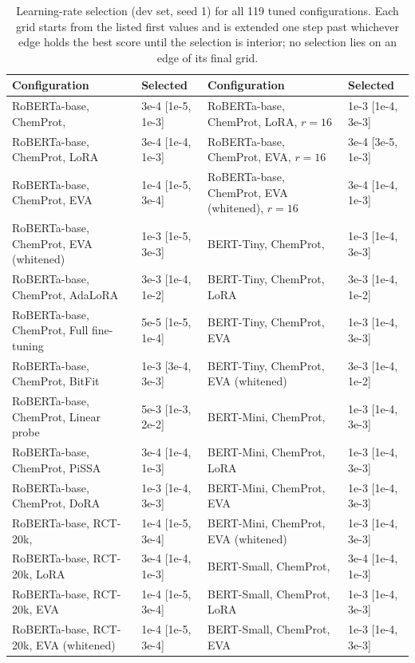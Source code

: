 \begin{table}[!ht]
\centering
\caption{Learning-rate selection (dev set, seed 1) for all 119 tuned configurations. Each grid starts from the listed first values and is extended one step past whichever edge holds the best score until the selection is interior; no selection lies on an edge of its final grid.}
\label{tab:lr}
\scriptsize
\setlength{\tabcolsep}{3pt}
\begin{tabular}{llll}
\toprule
Configuration & Selected & Configuration & Selected \\
\midrule
RoBERTa-base, ChemProt, \method{} & 3e-4 [1e-5, 1e-3] & RoBERTa-base, ChemProt, LoRA, $r{=}16$ & 1e-3 [1e-4, 3e-3] \\
RoBERTa-base, ChemProt, LoRA & 3e-4 [1e-4, 1e-3] & RoBERTa-base, ChemProt, EVA, $r{=}16$ & 3e-4 [3e-5, 1e-3] \\
RoBERTa-base, ChemProt, EVA & 1e-4 [1e-5, 3e-4] & RoBERTa-base, ChemProt, EVA (whitened), $r{=}16$ & 3e-4 [1e-4, 1e-3] \\
RoBERTa-base, ChemProt, EVA (whitened) & 1e-3 [1e-5, 3e-3] & BERT-Tiny, ChemProt, \method{} & 1e-3 [1e-4, 3e-3] \\
RoBERTa-base, ChemProt, AdaLoRA & 3e-3 [1e-4, 1e-2] & BERT-Tiny, ChemProt, LoRA & 3e-3 [1e-4, 1e-2] \\
RoBERTa-base, ChemProt, Full fine-tuning & 5e-5 [1e-5, 1e-4] & BERT-Tiny, ChemProt, EVA & 1e-3 [1e-4, 3e-3] \\
RoBERTa-base, ChemProt, BitFit & 1e-3 [3e-4, 3e-3] & BERT-Tiny, ChemProt, EVA (whitened) & 3e-3 [1e-4, 1e-2] \\
RoBERTa-base, ChemProt, Linear probe & 5e-3 [1e-3, 2e-2] & BERT-Mini, ChemProt, \method{} & 1e-3 [1e-4, 3e-3] \\
RoBERTa-base, ChemProt, PiSSA & 3e-4 [1e-4, 1e-3] & BERT-Mini, ChemProt, LoRA & 1e-3 [1e-4, 3e-3] \\
RoBERTa-base, ChemProt, DoRA & 1e-3 [1e-4, 3e-3] & BERT-Mini, ChemProt, EVA & 1e-3 [1e-4, 3e-3] \\
RoBERTa-base, RCT-20k, \method{} & 1e-4 [1e-5, 3e-4] & BERT-Mini, ChemProt, EVA (whitened) & 1e-3 [1e-4, 3e-3] \\
RoBERTa-base, RCT-20k, LoRA & 3e-4 [1e-4, 1e-3] & BERT-Small, ChemProt, \method{} & 3e-4 [1e-4, 1e-3] \\
RoBERTa-base, RCT-20k, EVA & 1e-4 [1e-5, 3e-4] & BERT-Small, ChemProt, LoRA & 1e-3 [1e-4, 3e-3] \\
RoBERTa-base, RCT-20k, EVA (whitened) & 1e-4 [1e-5, 3e-4] & BERT-Small, ChemProt, EVA & 1e-3 [1e-4, 3e-3] \\

\end{tabular}
\end{table}
